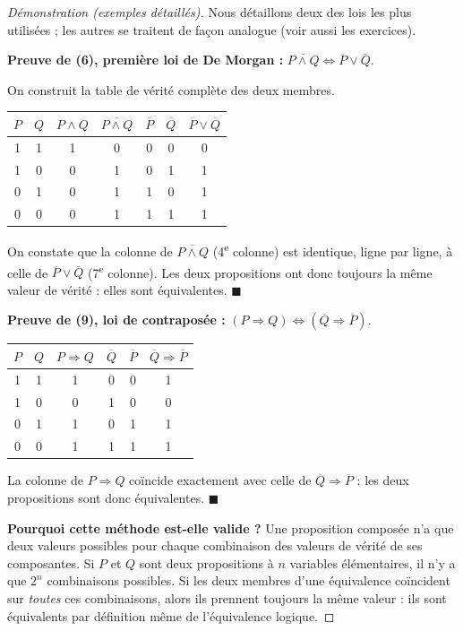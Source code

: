 \documentclass[a4paper,12pt,openany]{book}
\providecommand{\up}[1]{\textsuperscript{#1}}
\begin{document}
\begin{proof}[Démonstration (exemples détaillés)]
Nous détaillons deux des lois les plus utilisées ; les autres se traitent de
façon analogue (voir aussi les exercices).

\medskip
\textbf{Preuve de (6), première loi de De Morgan :}
$\overline{P\wedge Q} \iff \overline{P}\vee \overline{Q}$.

On construit la table de vérité complète des deux membres.

\begin{center}
\begin{tabular}{|c|c|c|c|c|c|c|}
\hline
$P$ & $Q$ & $P\wedge Q$ & $\overline{P\wedge Q}$ & $\overline{P}$ & $\overline{Q}$ & $\overline{P}\vee\overline{Q}$ \\
\hline
1 & 1 & 1 & 0 & 0 & 0 & 0 \\
1 & 0 & 0 & 1 & 0 & 1 & 1 \\
0 & 1 & 0 & 1 & 1 & 0 & 1 \\
0 & 0 & 0 & 1 & 1 & 1 & 1 \\
\hline
\end{tabular}
\end{center}

On constate que la colonne de $\overline{P\wedge Q}$ (4\up{e} colonne) est
identique, ligne par ligne, à celle de $\overline{P}\vee\overline{Q}$
(7\up{e} colonne). Les deux propositions ont donc toujours la même valeur de
vérité : elles sont équivalentes. $\blacksquare$

\medskip
\textbf{Preuve de (9), loi de contraposée :}
$(P\Rightarrow Q) \iff (\overline{Q}\Rightarrow \overline{P})$.

\begin{center}
\begin{tabular}{|c|c|c|c|c|c|}
\hline
$P$ & $Q$ & $P\Rightarrow Q$ & $\overline{Q}$ & $\overline{P}$ & $\overline{Q}\Rightarrow \overline{P}$ \\
\hline
1 & 1 & 1 & 0 & 0 & 1 \\
1 & 0 & 0 & 1 & 0 & 0 \\
0 & 1 & 1 & 0 & 1 & 1 \\
0 & 0 & 1 & 1 & 1 & 1 \\
\hline
\end{tabular}
\end{center}

La colonne de $P\Rightarrow Q$ coïncide exactement avec celle de
$\overline{Q}\Rightarrow\overline{P}$ : les deux propositions sont donc
équivalentes. $\blacksquare$

\medskip
\textbf{Pourquoi cette méthode est-elle valide ?} Une proposition composée
n'a que deux valeurs possibles pour chaque combinaison des valeurs de vérité de
ses composantes. Si $P$ et $Q$ sont deux propositions à $n$ variables
élémentaires, il n'y a que $2^n$ combinaisons possibles. Si les deux membres
d'une équivalence coïncident sur \emph{toutes} ces combinaisons, alors ils
prennent toujours la même valeur : ils sont équivalents par définition même de
l'équivalence logique.
\end{proof}
\end{document}
